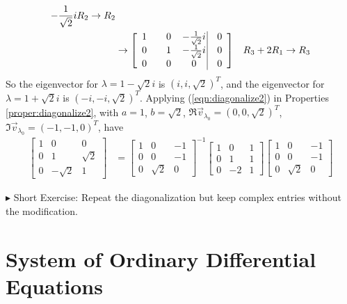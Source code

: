 \begin{solution}
\begin{align*}
\begin{aligned}
-\frac{1}{\sqrt{2}}i R_2 &\to R_2 \\
\end{aligned} \\
&\to  
\left[\begin{array}{@{}wc{15pt}wc{15pt}wc{17pt}|wc{15pt}@{}}
1 & 0 & -\frac{1}{\sqrt{2}}i & 0 \\
0 & 1 & -\frac{1}{\sqrt{2}}i & 0 \\
0 & 0 & 0 & 0
\end{array}\right] & R_3 + 2R_1 \to R_3 
\end{align*}
So the eigenvector for $\lambda = 1 - \sqrt{2}i$ is $(i, i, \sqrt{2})^T$, and the eigenvector for $\lambda = 1 + \sqrt{2}i$ is $(-i, -i, \sqrt{2})^T$. Applying (\ref{eqn:diagonalize2}) in Properties \ref{proper:diagonalize2}, with $a = 1$, $b = \sqrt{2}$, $\Re{\vec{v}_{\lambda_0}} = (0,0,\sqrt{2})^T$, $\Im{\vec{v}_{\lambda_0}} = (-1,-1,0)^T$, have
\begin{align*}
\begin{bmatrix}
1 & 0 & 0 \\
0 & 1 & \sqrt{2} \\
0 & -\sqrt{2} & 1
\end{bmatrix}
&= 
\begin{bmatrix}
1 & 0 & -1 \\
0 & 0 & -1 \\
0 & \sqrt{2} & 0 
\end{bmatrix}^{-1}
\begin{bmatrix}
1 & 0 & 1 \\
0 & 1 & 1 \\
0 & -2 & 1
\end{bmatrix}
\begin{bmatrix}
1 & 0 & -1 \\
0 & 0 & -1 \\
0 & \sqrt{2} & 0 
\end{bmatrix}
\end{align*}
\end{solution}
$\blacktriangleright$ Short Exercise: Repeat the diagonalization but keep complex entries without the modification.\footnotemark

\section{System of Ordinary Differential Equations}
\label{section:sysode}


